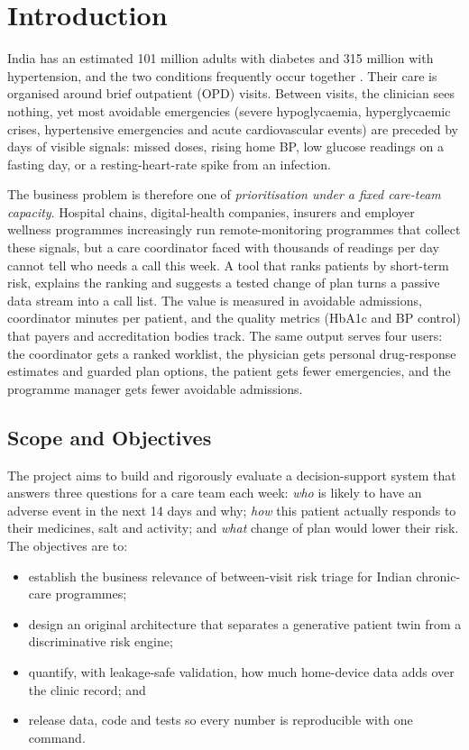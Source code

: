 \documentclass[conference]{IEEEtran}
\begin{document}
\section{Introduction}
India has an estimated 101 million adults with diabetes and 315 million with hypertension, and the two conditions frequently occur together \cite{anjana2023}. Their care is organised around brief outpatient (OPD) visits. Between visits, the clinician sees nothing, yet most avoidable emergencies (severe hypoglycaemia, hyperglycaemic crises, hypertensive emergencies and acute cardiovascular events) are preceded by days of visible signals: missed doses, rising home BP, low glucose readings on a fasting day, or a resting-heart-rate spike from an infection.

The business problem is therefore one of \emph{prioritisation under a fixed care-team capacity}. Hospital chains, digital-health companies, insurers and employer wellness programmes increasingly run remote-monitoring programmes that collect these signals, but a care coordinator faced with thousands of readings per day cannot tell who needs a call this week. A tool that ranks patients by short-term risk, explains the ranking and suggests a tested change of plan turns a passive data stream into a call list. The value is measured in avoidable admissions, coordinator minutes per patient, and the quality metrics (HbA1c and BP control) that payers and accreditation bodies track. The same output serves four users: the coordinator gets a ranked worklist, the physician gets personal drug-response estimates and guarded plan options, the patient gets fewer emergencies, and the programme manager gets fewer avoidable admissions.

\subsection{Scope and Objectives}
The project aims to build and rigorously evaluate a decision-support system that answers three questions for a care team each week: \emph{who} is likely to have an adverse event in the next 14 days and why; \emph{how} this patient actually responds to their medicines, salt and activity; and \emph{what} change of plan would lower their risk. The objectives are to:
\begin{itemize}
\item establish the business relevance of between-visit risk triage for Indian chronic-care programmes;
\item design an original architecture that separates a generative patient twin from a discriminative risk engine;
\item quantify, with leakage-safe validation, how much home-device data adds over the clinic record; and
\item release data, code and tests so every number is reproducible with one command.
\end{itemize}
\end{document}
